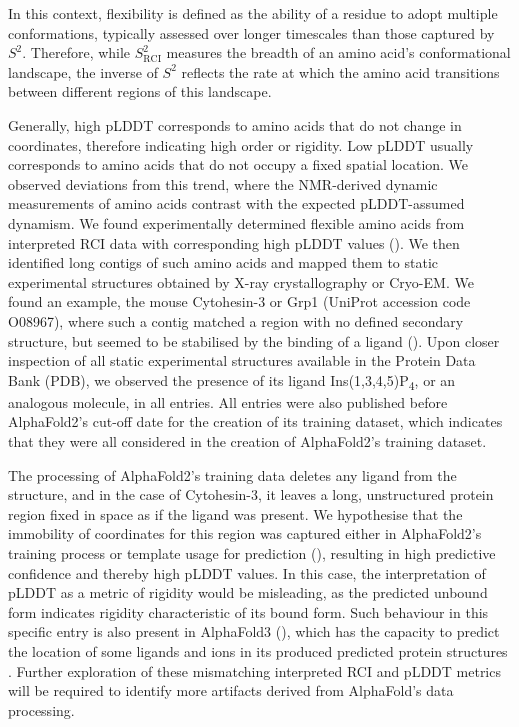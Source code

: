 In this context, flexibility is defined as the ability of a residue to adopt multiple conformations, typically assessed over longer timescales than those captured by $S^{2}$. Therefore, while $S^{2}_{\text{RCI}}$ measures the breadth of an amino acid's conformational landscape, the inverse of $S^{2}$ reflects the rate at which the amino acid transitions between different regions of this landscape.

Generally, high pLDDT corresponds to amino acids that do not change in coordinates, therefore indicating high order or rigidity. Low pLDDT usually corresponds to amino acids that do not occupy a fixed spatial location. We observed deviations from this trend, where the NMR-derived dynamic measurements of amino acids contrast with the expected pLDDT-assumed dynamism. We found experimentally determined flexible amino acids from interpreted RCI data \cite{orlando_shiftcrypt_2020} with corresponding high pLDDT values (). We then identified long contigs of such amino acids and mapped them to static experimental structures obtained by X-ray crystallography or Cryo-EM. We found an example, the mouse Cytohesin-3 or Grp1 (UniProt accession code O08967), where such a contig matched a region with no defined secondary structure, but seemed to be stabilised by the binding of a ligand (). Upon closer inspection of all static experimental structures available in the Protein Data Bank (PDB), we observed the presence of its ligand Ins(1,3,4,5)P\textsubscript{4}, or an analogous molecule, in all entries. All entries were also published before AlphaFold2's cut-off date for the creation of its training dataset, which indicates that they were all considered in the creation of AlphaFold2's training dataset. 

The processing of AlphaFold2's training data deletes any ligand from the structure, and in the case of Cytohesin-3, it leaves a long, unstructured protein region fixed in space as if the ligand was present. We hypothesise that the immobility of coordinates for this region was captured either in AlphaFold2's training process or template usage for prediction (), resulting in high predictive confidence and thereby high pLDDT values. In this case, the interpretation of pLDDT as a metric of rigidity would be misleading, as the predicted unbound form indicates rigidity characteristic of its bound form. Such behaviour in this specific entry is also present in AlphaFold3 (), which has the capacity to predict the location of some ligands and ions in its produced predicted protein structures \cite{abramson_accurate_2024}. Further exploration of these mismatching interpreted RCI and pLDDT metrics will be required to identify more artifacts derived from AlphaFold's data processing. 


